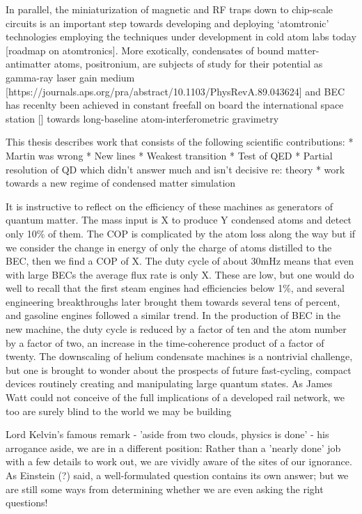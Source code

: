 	In parallel, the miniaturization of magnetic and RF traps down to chip-scale circuits is an important step towards developing and deploying `atomtronic' technologies employing the techniques under development in cold atom labs today [roadmap on atomtronics].
	More exotically, condensates of bound matter-antimatter atoms, positronium, are subjects of study for their potential as gamma-ray laser gain medium [https://journals.aps.org/pra/abstract/10.1103/PhysRevA.89.043624]
	and BEC has recenlty been achieved in constant freefall on board the international space station [] towards long-baseline atom-interferometric gravimetry


This thesis describes work that consists of the following scientific
contributions: * Martin was wrong * New lines * Weakest transition *
Test of QED * Partial resolution of QD which didn't answer much and
isn't decisive re: theory * work towards a new regime of condensed
matter simulation

It is instructive to reflect on the efficiency of these machines as generators of quantum matter.
	The mass input is X to produce Y condensed atoms and detect only 10\% of them.
	The COP is complicated by the atom loss along the way but if we consider the change in energy of only the charge of atoms distilled to the BEC, then we find a COP of X.
	The duty cycle of about 30mHz means that even with large BECs the average flux rate is only X.
	These are low, but one would do well to recall that the first steam engines had efficiencies below 1\%, and several engineering breakthroughs later brought them towards several tens of percent, and gasoline engines followed a similar trend.
	In the production of BEC in the new machine, the duty cycle is reduced by a factor of ten and the atom number by a factor of two, an increase in the time-coherence product of a factor of twenty.
	The downscaling of helium condensate machines is a nontrivial challenge, but one is brought to wonder about the prospects of future fast-cycling, compact devices routinely creating and manipulating large quantum states.
	As James Watt could not conceive of the full implications of a developed rail network, we too are surely blind to the world we may be building


Lord Kelvin's famous remark - 'aside from two clouds, physics is done' - his arrogance aside, we are in a different position: Rather than a 'nearly done' job with a few details to work out, we are vividly aware of the sites of our ignorance.
	As Einstein (?) said, a well-formulated question contains its own answer; but we are still some ways from determining whether we are even asking the right questions!

